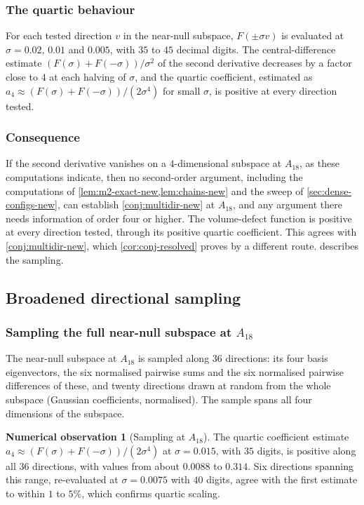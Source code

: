 \documentclass[11pt,reqno]{amsart}
\renewcommand{\_}{\origunderscore\allowbreak}
\numberwithin{equation}{section}
\theoremstyle{plain}
\theoremstyle{definition}
\newtheorem{numobs}[thm]{Numerical observation}
\theoremstyle{remark}
\begin{document}
\subsubsection{The quartic behaviour}

For each tested direction $v$ in the near-null subspace, $F(\pm\sigma
v)$ is evaluated at $\sigma=0.02$, $0.01$ and $0.005$, with $35$ to $45$
decimal digits. The central-difference estimate
$(F(\sigma)+F(-\sigma))/\sigma^2$ of the second derivative decreases by
a factor close to $4$ at each halving of $\sigma$, and the quartic
coefficient, estimated as $a_4\approx(F(\sigma)+F(-\sigma))/(2\sigma^4)$
for small $\sigma$, is positive at every direction tested.

\subsubsection{Consequence}

If the second derivative vanishes on a $4$-dimensional subspace at
$A_{18}$, as these computations indicate, then no second-order
argument, including the computations of
\cref{lem:m2-exact-new,lem:chains-new} and the sweep of
\cref{sec:dense-configs-new}, can establish \cref{conj:multidir-new} at
$A_{18}$, and any argument there needs information of order four or
higher. The volume-defect function is positive at every direction
tested, through its positive quartic coefficient. This agrees with
\cref{conj:multidir-new}, which \cref{cor:conj-resolved} proves by a
different route.  describes the sampling.

\subsection{Broadened directional sampling}\label{sec:broad-sample}

\subsubsection{Sampling the full near-null subspace at \texorpdfstring{$A_{18}$}{A18}}

The near-null subspace at $A_{18}$ is sampled along $36$ directions: its
four basis eigenvectors, the six normalised pairwise sums and the six
normalised pairwise differences of these, and twenty directions drawn
at random from the whole subspace (Gaussian coefficients, normalised).
The sample spans all four dimensions of the subspace.

\begin{numobs}[Sampling at $A_{18}$]\label{thm:broad-sample-18-new}
The quartic coefficient estimate
$a_4\approx(F(\sigma)+F(-\sigma))/(2\sigma^4)$ at $\sigma=0.015$, with
$35$ digits, is positive along all $36$ directions, with values from
about $0.0088$ to $0.314$. Six directions spanning this range,
re-evaluated at $\sigma=0.0075$ with $40$ digits, agree with the first
estimate to within $1$ to $5\%$, which confirms quartic scaling.
\end{numobs}
\end{document}
